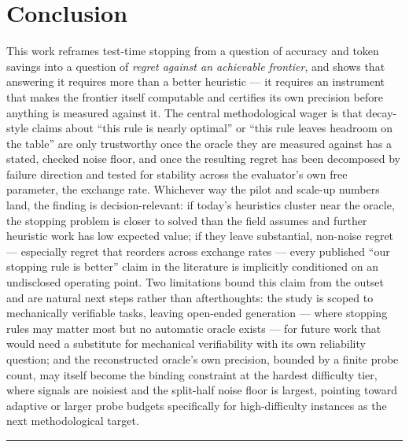 \documentclass[11pt]{article}
\begin{document}
\section{Conclusion}

This work reframes test-time stopping from a question of accuracy and token savings into a question of \emph{regret against an achievable frontier}, and shows that answering it requires more than a better heuristic --- it requires an instrument that makes the frontier itself computable and certifies its own precision before anything is measured against it. The central methodological wager is that decay-style claims about ``this rule is nearly optimal'' or ``this rule leaves headroom on the table'' are only trustworthy once the oracle they are measured against has a stated, checked noise floor, and once the resulting regret has been decomposed by failure direction and tested for stability across the evaluator's own free parameter, the exchange rate. Whichever way the pilot and scale-up numbers land, the finding is decision-relevant: if today's heuristics cluster near the oracle, the stopping problem is closer to solved than the field assumes and further heuristic work has low expected value; if they leave substantial, non-noise regret --- especially regret that reorders across exchange rates --- every published ``our stopping rule is better'' claim in the literature is implicitly conditioned on an undisclosed operating point. Two limitations bound this claim from the outset and are natural next steps rather than afterthoughts: the study is scoped to mechanically verifiable tasks, leaving open-ended generation --- where stopping rules may matter most but no automatic oracle exists --- for future work that would need a substitute for mechanical verifiability with its own reliability question; and the reconstructed oracle's own precision, bounded by a finite probe count, may itself become the binding constraint at the hardest difficulty tier, where signals are noisiest and the split-half noise floor is largest, pointing toward adaptive or larger probe budgets specifically for high-difficulty instances as the next methodological target.

\vspace{1em}
\hrule
\vspace{1em}
\end{document}
